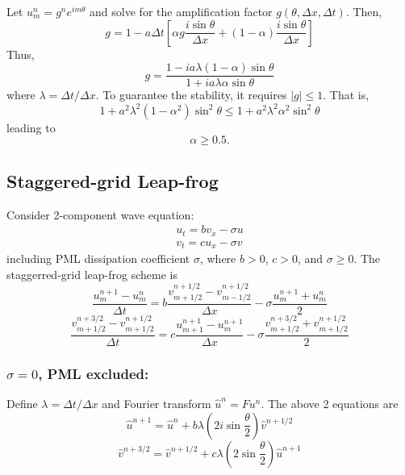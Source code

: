 Let $u_m^n=g^n e^{im\theta}$ and solve for the amplification factor $g(\theta,\Delta x, \Delta t)$. Then,
\begin{equation}
 g=1-a\Delta t \left[
 \alpha g \frac{i\sin\theta}{\Delta x}+(1-\alpha)\frac{i\sin\theta}{\Delta x}
 \right]
\end{equation}
Thus,
\begin{equation}
 g=\frac{1-ia\lambda(1-\alpha)\sin\theta}{1+ia\lambda\alpha\sin\theta}
\end{equation}
where $\lambda=\Delta t/\Delta x$. To guarantee the stability, it requires $|g|\leq 1$. That is,
\begin{equation}
 1+a^2\lambda^2(1-\alpha^2)\sin^2\theta \leq 1+a^2 \lambda^2\alpha^2\sin^2\theta
\end{equation}
leading to
\begin{equation}
 \alpha\geq 0.5.
\end{equation}


\subsection{Staggered-grid Leap-frog}
Consider 2-component wave equation:
\begin{gather}
u_t=b v_x-\sigma u\\
v_t=c u_x-\sigma v 
\end{gather}
including PML dissipation coefficient $\sigma$, where $b>0$, $c>0$, and $\sigma\geq 0$. The staggerred-grid leap-frog scheme is
\begin{equation}\label{eq:pml1}
 \frac{u_m^{n+1}-u_m^n}{\Delta t}=b\frac{v_{m+1/2}^{n+1/2}-v_{m-1/2}^{n+1/2}}{\Delta x}-\sigma \frac{u_m^{n+1}+u_m^n}{2}
\end{equation}
\begin{equation}\label{eq:pml2}
 \frac{v_{m+1/2}^{n+3/2}-v_{m+1/2}^{n+1/2}}{\Delta t}=c \frac{u_{m+1}^{n+1}-u_m^{n+1}}{\Delta x}-\sigma \frac{v_{m+1/2}^{n+3/2}+v_{m+1/2}^{n+1/2}}{2}
\end{equation}

\subsubsection{$\sigma=0$, PML excluded:}

Define $\lambda=\Delta t/\Delta x$ and Fourier transform $\hat{u}^n=F{u^n}$. The above 2 equations are
\begin{equation}
 \hat{u}^{n+1}=\hat{u}^n+b\lambda(2i\sin\frac{\theta}{2})\hat{v}^{n+1/2}
\end{equation}
\begin{equation}
 \hat{v}^{n+3/2}=\hat{v}^{n+1/2}+c\lambda(2\sin\frac{\theta}{2})\hat{u}^{n+1}
\end{equation}

